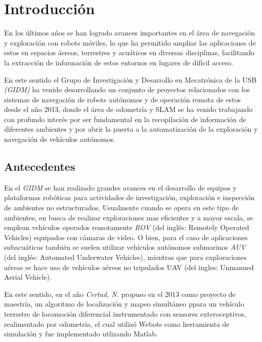 \chapter{Introducción}
\label{capitulo1}

En los últimos años se han logrado avances importantes en el área de navegación y exploración con robots móviles, lo que ha permitido ampliar las aplicaciones de estos en espacios áereos, terrestres y acuáticos en diversas disciplinas, facilitando la extracción de información de estos entornos en lugares de difícil acceso.

En este sentido el Grupo de Investigación y Desarrollo en Mecatrónica de la USB \textit{(GIDM)} ha venido desarrollando un conjunto de proyectos relacionados con los sistemas de navegación de robots autónomos y de operación remota de estos desde el año 2013, donde el área de odometría y SLAM se ha venido trabajando con profundo interés por ser fundamental en la recopilación de información de diferentes ambientes y por abrir la puerta a la automatización de la exploración y navegación de vehículos autónomos.

\section{Antecedentes}

En el \textit{GIDM} se han realizado grandes avances en el desarrollo de equipos y plataformas robóticas para actividades de investigación, exploración e inspección de ambientes no estructurados. Usualmente cuando se opera en este tipo de ambientes, en busca de realizar exploraciones mas eficientes y a mayor escala, se emplean vehículos operados remotamente \textit{ROV} (del inglés: Remotely Operated Vehicles) equipados con cámaras de vídeo. O bien, para el caso de aplicaciones subacuáticas también se suelen utilizar vehículos autónomos submarinos \textit{AUV} (del inglés: Automated Underwater Vehicles), mientras que para exploraciones aéreas se hace uso de vehículos aéreos no tripulados UAV (del ingles: Unmanned Aerial Vehicle).

En este sentido, en el año \textit{Certad, N.} \cite{novel} propuso en el 2013 como proyecto de maestría, un algoritmo de localización y mapeo simultáneo ppara un vehículo terrestre de locomoción diferencial instrumentado con sensores exteroceptivos, realimentado por odometría, el cual utilizó Webots como herramienta de simulación y fue implementado utlizando Matlab.


